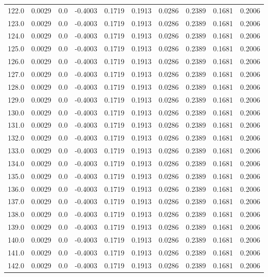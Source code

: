 \begin{longtable}{lrrrrrrrrr}
122.0 & 0.0029 & 0.0 & -0.4003 & 0.1719 & 0.1913 & 0.0286 & 0.2389 & 0.1681 & 0.2006 \\
123.0 & 0.0029 & 0.0 & -0.4003 & 0.1719 & 0.1913 & 0.0286 & 0.2389 & 0.1681 & 0.2006 \\
124.0 & 0.0029 & 0.0 & -0.4003 & 0.1719 & 0.1913 & 0.0286 & 0.2389 & 0.1681 & 0.2006 \\
125.0 & 0.0029 & 0.0 & -0.4003 & 0.1719 & 0.1913 & 0.0286 & 0.2389 & 0.1681 & 0.2006 \\
126.0 & 0.0029 & 0.0 & -0.4003 & 0.1719 & 0.1913 & 0.0286 & 0.2389 & 0.1681 & 0.2006 \\
127.0 & 0.0029 & 0.0 & -0.4003 & 0.1719 & 0.1913 & 0.0286 & 0.2389 & 0.1681 & 0.2006 \\
128.0 & 0.0029 & 0.0 & -0.4003 & 0.1719 & 0.1913 & 0.0286 & 0.2389 & 0.1681 & 0.2006 \\
129.0 & 0.0029 & 0.0 & -0.4003 & 0.1719 & 0.1913 & 0.0286 & 0.2389 & 0.1681 & 0.2006 \\
130.0 & 0.0029 & 0.0 & -0.4003 & 0.1719 & 0.1913 & 0.0286 & 0.2389 & 0.1681 & 0.2006 \\
131.0 & 0.0029 & 0.0 & -0.4003 & 0.1719 & 0.1913 & 0.0286 & 0.2389 & 0.1681 & 0.2006 \\
132.0 & 0.0029 & 0.0 & -0.4003 & 0.1719 & 0.1913 & 0.0286 & 0.2389 & 0.1681 & 0.2006 \\
133.0 & 0.0029 & 0.0 & -0.4003 & 0.1719 & 0.1913 & 0.0286 & 0.2389 & 0.1681 & 0.2006 \\
134.0 & 0.0029 & 0.0 & -0.4003 & 0.1719 & 0.1913 & 0.0286 & 0.2389 & 0.1681 & 0.2006 \\
135.0 & 0.0029 & 0.0 & -0.4003 & 0.1719 & 0.1913 & 0.0286 & 0.2389 & 0.1681 & 0.2006 \\
136.0 & 0.0029 & 0.0 & -0.4003 & 0.1719 & 0.1913 & 0.0286 & 0.2389 & 0.1681 & 0.2006 \\
137.0 & 0.0029 & 0.0 & -0.4003 & 0.1719 & 0.1913 & 0.0286 & 0.2389 & 0.1681 & 0.2006 \\
138.0 & 0.0029 & 0.0 & -0.4003 & 0.1719 & 0.1913 & 0.0286 & 0.2389 & 0.1681 & 0.2006 \\
139.0 & 0.0029 & 0.0 & -0.4003 & 0.1719 & 0.1913 & 0.0286 & 0.2389 & 0.1681 & 0.2006 \\
140.0 & 0.0029 & 0.0 & -0.4003 & 0.1719 & 0.1913 & 0.0286 & 0.2389 & 0.1681 & 0.2006 \\
141.0 & 0.0029 & 0.0 & -0.4003 & 0.1719 & 0.1913 & 0.0286 & 0.2389 & 0.1681 & 0.2006 \\
142.0 & 0.0029 & 0.0 & -0.4003 & 0.1719 & 0.1913 & 0.0286 & 0.2389 & 0.1681 & 0.2006 \\

\end{longtable}

